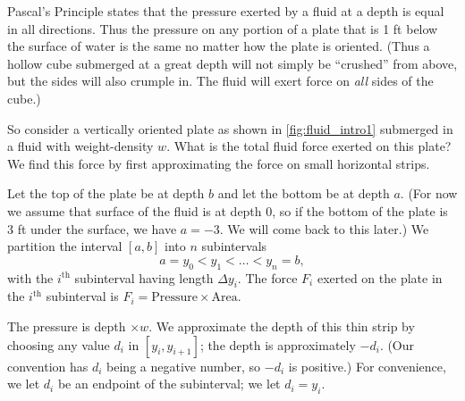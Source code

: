 Pascal's Principle states  that the pressure exerted by a fluid at a depth is equal in all directions. Thus the pressure on any portion of a plate that is 1 ft below the surface of water is the same no matter how the plate is oriented. (Thus a hollow cube submerged at a great depth will not simply be ``crushed'' from above, but the sides will also crumple in. The fluid will exert force on \emph{all} sides of the cube.)


So consider a vertically oriented plate as shown in \autoref{fig:fluid_intro1} submerged in a fluid with weight-density $w$. What is the total fluid force exerted on this plate? We find this force by first approximating the force on small horizontal strips.

Let the top of the plate be at depth $b$ and let the bottom be at depth $a$. (For now we assume that surface of the fluid is at depth 0, so if the bottom of the plate is 3 ft under the surface, we have $a=-3$. We will come back to this later.) We partition the interval $[a,b]$ into $n$ subintervals 
\[a=y_0<y_1<\dotso<y_n=b,\]
with the $i^{\text{th}}$ subinterval having length $\Delta y_i$. The force $F_i$ exerted on the plate in the $i^{\text{th}}$ subinterval is $F_i = \text{Pressure}\times \text{Area}.$

The pressure is depth $\times w$. We approximate the depth of this thin strip by choosing any value $d_i$ in $[y_i,y_{i+1}]$; the depth is approximately $-d_i$. (Our convention has $d_i$ being a negative number, so $-d_i$ is positive.) For convenience, we let $d_i$ be an endpoint of the subinterval; we let $d_i = y_i$. 

